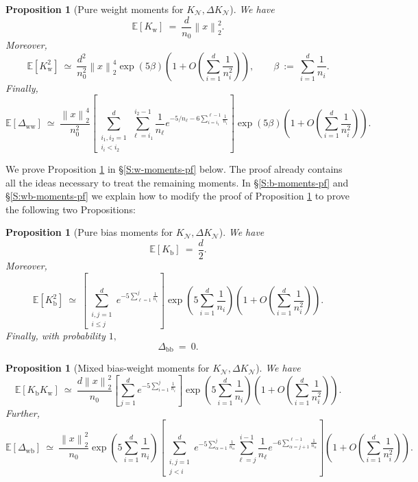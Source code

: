 \documentclass[11pt, reqno]{amsart}
\newtheorem{proposition}[theorem]{Proposition}
\newcommand{\E}[1]{{\mathbb E}\left [#1\right]}
\newcommand{\lr}[1]{\ensuremath{\left(#1 \right)}}
\newcommand{\norm}[1]{\left\lVert#1\right\rVert}
\newcommand{\mN}{\mathcal N}
\newcommand{\Kw}{K_{\mathrm{w}}}
\newcommand{\Kb}{K_{\mathrm{b}}}
\newcommand{\Dww}{\Delta_{\mathrm{ww}}}
\newcommand{\Dwb}{\Delta_{\mathrm{wb}}}
\newcommand{\Dbb}{\Delta_{\mathrm{bb}}}
\begin{document}
\begin{proposition}[Pure weight moments for $K_{\mN}, \Delta K_{\mN}$]\label{P:w-moments}
  We have
\[\E{\Kw}~=~\frac{d}{n_0}\norm{x}_2^2.\]
Moreover, 
\[\E{\Kw^2}~\simeq~\frac{d^2}{n_0^2}\norm{x}_2^4\exp\lr{5\beta}\lr{1+O\lr{\sum_{i=1}^d \frac{1}{n_i^2}}},\qquad \beta~:=~ \sum_{i=1}^{d}\frac{1}{n_i}.\]
Finally, 
\[\E{\Dww}~\simeq~ \frac{\norm{x}_2^4}{n_0^2}\left[\sum_{\substack{i_1,i_2=1\\i_i<i_2}}^d \sum_{\ell=i_1}^{i_2-1} \frac{1}{n_\ell} e^{-5/n_\ell-6\sum_{i=i_1}^{\ell-1}\frac{1}{n_i}}\right]\exp\lr{5\beta}\lr{1+O\lr{\sum_{i=1}^d\frac{1}{n_i^2}}}.\]
\end{proposition}
We prove Proposition \ref{P:w-moments} in \S \ref{S:w-moments-pf} below. The proof already contains all the ideas necessary to treat the remaining moments. In \S \ref{S:b-moments-pf} and \S \ref{S:wb-moments-pf} we explain how to modify the proof of Proposition \ref{P:w-moments} to prove the following two Propositions:
\begin{proposition}[Pure bias moments for $K_{\mN}, \Delta K_{\mN}$]\label{P:b-moments}
  We have
\[\E{\Kb}~=~\frac{d}{2}.\]
Moreover, 
\[\E{\Kb^2}~\simeq~\left[\sum_{\substack{i,j=1\\ i\leq j}}^d e^{-5\sum_{\ell = 1}^j \frac{1}{n_i}}\right]\exp\lr{5\sum_{i=1}^d\frac{1}{n_i}}\lr{1+O\lr{\sum_{i=1}^d \frac{1}{n_i^2}}}.\]
Finally, with probability $1,$
\[\Dbb~=~ 0.\]
\end{proposition}
\begin{proposition}[Mixed bias-weight moments for $K_{\mN}, \Delta K_{\mN}$]\label{P:wb-moments}
  We have
\[\E{\Kb\Kw}~\simeq~\frac{d\norm{x}_2^2}{n_0} \left[\sum_{j=1}^d e^{-5 \sum_{i=1}^j \frac{1}{n_i}}\right] \exp\lr{5\sum_{i=1}^d\frac{1}{n_i}}\lr{1+O\lr{\sum_{i=1}^d\frac{1}{n_i^2}}}.\]
Further, 
\[\E{\Dwb}~\simeq~  \frac{\norm{x}_2^2}{n_0}\exp\lr{5\sum_{i=1}^d \frac{1}{n_i}}\left[\sum_{\substack{i,j=1\\j<i}}^d e^{-5\sum_{\alpha=1}^j \frac{1}{n_\alpha}}\sum_{\ell=j}^{i-1} \frac{1}{n_\ell} e^{-6\sum_{\alpha=j+1}^{\ell-1}\frac{1}{n_\alpha}}\right]\lr{1+O\lr{\sum_{i=1}^d \frac{1}{n_i^2}}}.\]
\end{proposition}
\end{document}
